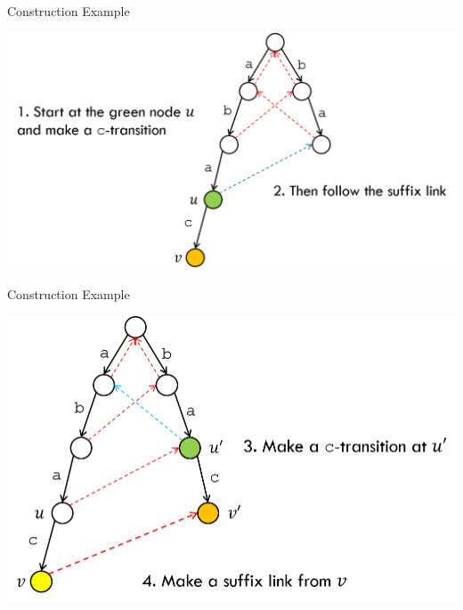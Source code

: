 \documentclass[13pt,onlymath]{beamer}
\begin{document}
\begin{frame}{Construction Example}
\begin{center}
\includegraphics[height=0.5\textheight]{figures/trie2}
\end{center}
\end{frame}

\begin{frame}{Construction Example}
\begin{center}
\includegraphics[height=0.5\textheight]{figures/trie3}
\end{center}
\end{frame}
\end{document}
